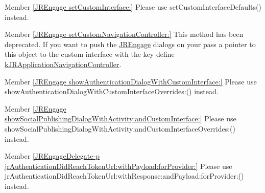 \label{deprecated__deprecated000018}
\hypertarget{deprecated__deprecated000018}{}
 
\begin{DoxyDescription}
\item[Member \hyperlink{class_j_r_engage_ae9cce08f42f575bc49329b363af5c531}{\mbox{[}JREngage setCustomInterface:\mbox{]}} ]Please use setCustomInterfaceDefaults() instead. 
\end{DoxyDescription}

\label{deprecated__deprecated000020}
\hypertarget{deprecated__deprecated000020}{}
 
\begin{DoxyDescription}
\item[Member \hyperlink{class_j_r_engage_a6c704bbff377d20603e6b52bd0ae17f1}{\mbox{[}JREngage setCustomNavigationController:\mbox{]}} ]This method has been deprecated. If you want to push the \hyperlink{class_j_r_engage}{JREngage} dialogs on your pass a pointer to this object to the custom interface with the key define \hyperlink{group__custom_interface_ga7bace8001f549fc2ecbe84d967d24d22}{kJRApplicationNavigationController}. 
\end{DoxyDescription}

\label{deprecated__deprecated000021}
\hypertarget{deprecated__deprecated000021}{}
 
\begin{DoxyDescription}
\item[Member \hyperlink{class_j_r_engage_ac8e1206be8608fbed548b7ec5f85e6e6}{\mbox{[}JREngage showAuthenticationDialogWithCustomInterface:\mbox{]}} ]Please use showAuthenticationDialogWithCustomInterfaceOverrides:() instead. 
\end{DoxyDescription}

\label{deprecated__deprecated000022}
\hypertarget{deprecated__deprecated000022}{}
 
\begin{DoxyDescription}
\item[Member \hyperlink{class_j_r_engage_af5c2aa40f5c45a22f369900d1bd81953}{\mbox{[}JREngage showSocialPublishingDialogWithActivity:andCustomInterface:\mbox{]}} ]Please use showSocialPublishingDialogWithActivity:andCustomInterfaceOverrides:() instead. 
\end{DoxyDescription}

\label{deprecated__deprecated000019}
\hypertarget{deprecated__deprecated000019}{}
 
\begin{DoxyDescription}
\item[Member \hyperlink{protocol_j_r_engage_delegate-p_abfafec7eed95008f7b7052d962f8f6fa}{\mbox{[}JREngageDelegate-\/p jrAuthenticationDidReachTokenUrl:withPayload:forProvider:\mbox{]}} ]Please use jrAuthenticationDidReachTokenUrl:withResponse:andPayload:forProvider:() instead. 
\end{DoxyDescription}


